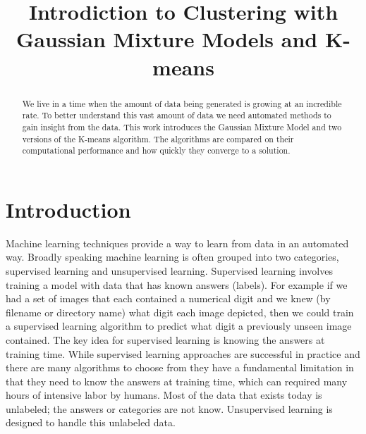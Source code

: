 \documentclass[conference]{IEEEtran}
\begin{document}
\title{Introdiction to Clustering with \\Gaussian Mixture Models and K-means}

\author{
}

\maketitle

\begin{abstract}
We live in a time when the amount of data being generated is growing at an incredible rate.  To better understand this vast amount of data we need automated methods to gain insight from the data.  This work introduces the Gaussian Mixture Model and two versions of the K-means algorithm.  The algorithms are compared on their computational performance and how quickly they converge to a solution.
\end{abstract}


\IEEEpeerreviewmaketitle




\section{Introduction}
Machine learning techniques provide a way to learn from data in an automated way.  Broadly speaking machine learning is often grouped into two categories, supervised learning and unsupervised learning.  Supervised learning involves training a model with data that has known answers (labels).  For example if we had a set of images that each contained a numerical digit and we knew (by filename or directory name) what digit each image depicted, then we could train a supervised learning algorithm to predict what digit a previously unseen image contained.  The key  idea for supervised learning is knowing the answers at training time.  While supervised learning approaches are successful in practice and there are many algorithms to choose from they have a fundamental limitation in that they need to know the answers at training time, which can required  many hours of intensive labor by humans.  Most of the data that exists today is unlabeled; the answers or categories are not know.  Unsupervised learning is designed to handle this unlabeled data.  
\end{document}
